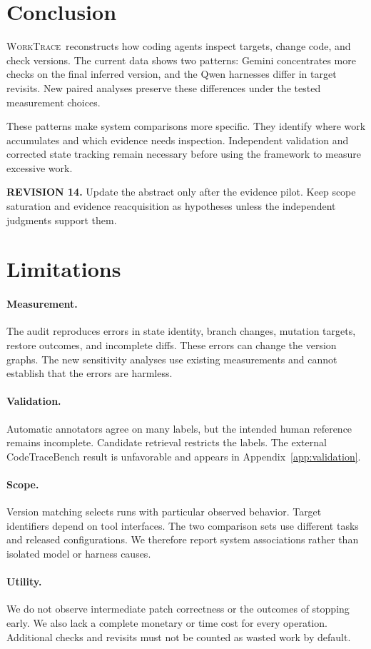 \documentclass[10pt,a4paper,twocolumn]{article}
\newcommand{\rev}[2]{\par\smallskip\noindent\begin{minipage}{\linewidth}\color{revision}\footnotesize\textbf{REVISION #1.} #2\end{minipage}\par\smallskip}
\newcommand{\wt}{\textsc{WorkTrace}}
\begin{document}
\section{Conclusion}
\wt\ reconstructs how coding agents inspect targets, change code, and check versions. The current data shows two patterns: Gemini concentrates more checks on the final inferred version, and the Qwen harnesses differ in target revisits. New paired analyses preserve these differences under the tested measurement choices.

These patterns make system comparisons more specific. They identify where work accumulates and which evidence needs inspection. Independent validation and corrected state tracking remain necessary before using the framework to measure excessive work.
\rev{14}{Update the abstract only after the evidence pilot. Keep scope saturation and evidence reacquisition as hypotheses unless the independent judgments support them.}

\section*{Limitations}
\paragraph{Measurement.}
The audit reproduces errors in state identity, branch changes, mutation targets, restore outcomes, and incomplete diffs. These errors can change the version graphs. The new sensitivity analyses use existing measurements and cannot establish that the errors are harmless.
\paragraph{Validation.}
Automatic annotators agree on many labels, but the intended human reference remains incomplete. Candidate retrieval restricts the labels. The external CodeTraceBench result is unfavorable and appears in Appendix~\ref{app:validation}.
\paragraph{Scope.}
Version matching selects runs with particular observed behavior. Target identifiers depend on tool interfaces. The two comparison sets use different tasks and released configurations. We therefore report system associations rather than isolated model or harness causes.
\paragraph{Utility.}
We do not observe intermediate patch correctness or the outcomes of stopping early. We also lack a complete monetary or time cost for every operation. Additional checks and revisits must not be counted as wasted work by default.
\end{document}
